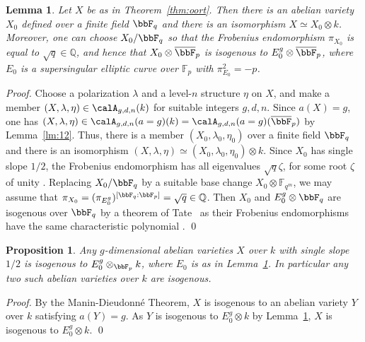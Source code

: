 \documentclass[]{amsart}
\theoremstyle{plain}
\newtheorem{lemma}[thm]{Lemma}
\newtheorem{prop}[thm]{Proposition}
\theoremstyle{definition}
\theoremstyle{remark}
\def\Fpbar{\overline{\bbF}_p}
\def\Fp{{\bbF}_p}
\def\Fq{{\bbF}_q}
\newcommand{\Q}{\mathbb Q}
\newcommand{\F}{\mathbb F}
\newcommand{\<}{\langle}   %
\renewcommand{\>}{\rangle} %
\newcommand{\dieu}{Dieudonn\'{e} }
\begin{document}
\begin{lemma}\label{lm:13}
  Let $X$ be as in Theorem~\ref{thm:oort}. Then there is an abelian variety
  $X_0$ defined over a finite field $\Fq$ and there is an isomorphism
  $X\simeq X_0 \otimes k$. Moreover, one can choose $X_0/\Fq$ so that the Frobenius endomorphism $\pi_{X_0}$ is equal to $\sqrt{q}\in \Q$, and hence that $X_0\otimes \Fpbar$ is isogenous to $E_0^g  \otimes \Fpbar$, where $E_0$ is a supersingular elliptic curve over $\F_{p}$ with $\pi_{E_0}^2=-p$. 
\end{lemma}
\begin{proof}
  Choose a polarization $\lambda$ and a level-$n$ structure $\eta$ on $X$, and make a member $(X,\lambda,\eta)\in \calA_{g,d,n}(k)$ for suitable integers $g,d,n$. Since $a(X)=g$, one has 
  $(X,\lambda,\eta)\in \calA_{g,d,n}(a=g)(k)=\calA_{g,d,n}(a=g)(\Fpbar)$ by  Lemma~\ref{lm:12}. Thus, there is a member $(X_0,\lambda_0,\eta_0)$ over a finite field $\Fq$ and there is an isomorphism  $(X,\lambda,\eta)\simeq (X_0,\lambda_0,\eta_0)\otimes k$. Since $X_0$ has single slope $1/2$, the Frobenius endomorphism has
  all eigenvalues $\sqrt{q} \zeta$, for some root $\zeta$ of
  unity \cite[p.~116]{oort:subvar}. Replacing $X_0/\Fq$ by a suitable base change $X_0\otimes \F_{q^m}$, we may assume that $\pi_{X_0}=(\pi_{E_0^g})^{[\Fq:\Fp]}= \sqrt{q}\in \Q$. Then $X_0$ and $E_0^g \otimes \Fq$ are isogenous over $\Fq$ by a theorem of Tate~\cite[Theorem 1]{tate:eav} as their Frobenius endomorphisms have the same characteristic polynomial . \qed   
\end{proof}



\begin{prop}\label{prop:14}
  Any $g$-dimensional abelian varieties $X$ over $k$
  with single slope $1/2$ is isogenous to $E_0^g\otimes_{\Fp} k$, where $E_0$ is as in Lemma~\ref{lm:13}. In particular any two such abelian varieties over $k$ are isogenous.
\end{prop}
\begin{proof}
  By the Manin-\dieu Theorem, $X$ is isogenous to an abelian variety
  $Y$ over $k$ satisfying $a(Y)=g$. As $Y$ is isogenous to $E_0^g\otimes k$ by Lemma~\ref{lm:13}, $X$ is isogenous to $E_0^g\otimes k$.  \qed   
\end{proof}
\end{document}
